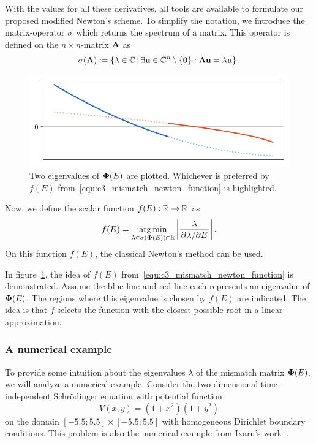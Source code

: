 With the values for all these derivatives, all tools are available to formulate our proposed modified Newton's scheme. To simplify the notation, we introduce the matrix-operator $\operatorname{\sigma}$ which returns the spectrum of a matrix. This operator is defined on the $n \times n$-matrix $\vb{A}$ as
$$
  \operatorname{\sigma}(\vb{A}) := \left\{\lambda \in \mathbb{C} \, \middle| \, \exists \vb{u} \in \mathbb{C}^n \setminus \{\vb{0}\} : \vb{A} \vb{u} = \lambda \vb{u} \right\}\text{.}
$$

\begin{figure}
  \begin{center}
    \includegraphics[width=\textwidth]{img/chapter3/select_lambda_newton.pdf}
  \end{center}
  \caption{Two eigenvalues of $\vb{\Phi}(E)$ are plotted. Whichever is preferred by $f(E)$ from~\eqref{equ:c3_mismatch_newton_function} is highlighted.}\label{fig:c3_select_lambda_newton}
\end{figure}

Now, we define the scalar function $f(E) : \mathbb{R} \to \mathbb{R}$ as
\begin{equation}\label{equ:c3_mismatch_newton_function}
  f(E) = \operatorname*{arg\,min}_{\lambda \in \operatorname{\sigma}(\vb{\Phi}(E)) \cap \mathbb{R}} \left|\frac{\lambda}{\pdv*[]{\lambda}{E}}\right|\text{.}
\end{equation}
On this function $f(E)$, the classical Newton's method can be used.

In figure~\ref{fig:c3_select_lambda_newton}, the idea of $f(E)$ from~\eqref{equ:c3_mismatch_newton_function} is demonstrated. Assume the blue line and red line each represents an eigenvalue of $\vb{\Phi}(E)$. The regions where this eigenvalue is chosen by $f(E)$ are indicated. The idea is that $f$ selects the function with the closest possible root in a linear approximation.

\subsubsection{A numerical example}

To provide some intuition about the eigenvalues $\lambda$ of the mismatch matrix $\vb{\Phi}(E)$, we will analyze a numerical example. Consider the two-dimensional time-independent Schrödinger equation with potential function
\begin{equation}\label{equ:c3_mismatch_ixaru}
  V(x, y) = (1+x^2)(1+y^2)
\end{equation}
on the domain $[-5.5; 5.5] \times [-5.5; 5.5]$ with homogeneous Dirichlet boundary conditions. This problem is also the numerical example from Ixaru's work~\cite{ixaru_new_2010}.

